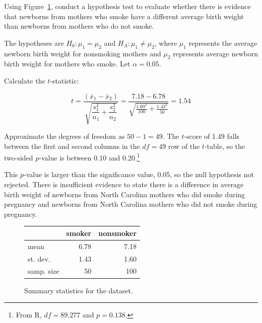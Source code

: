 \begin{examplewrap}
\begin{nexample}{Using Figure~\ref{summaryStatsBabySmoke}, conduct a hypothesis test to evaluate whether there is evidence that newborns from mothers who smoke have a different average birth weight than newborns from mothers who do not smoke.}

The hypotheses are $H_0: \mu_{1} = \mu_{2}$ and $H_A: \mu_{1} \neq \mu_{2}$, where $\mu_{1}$ represents the average newborn birth weight for nonsmoking mothers and $\mu_{2}$ represents average newborn birth weight for mothers who smoke. Let $\alpha = 0.05$. 	

Calculate the $t$-statistic:

\[t = \dfrac{(\overline{x}_1 - \overline{x}_2)}{\sqrt{\dfrac{s_{1}^{2}}{n_1} + \dfrac{s_{2}^{2}}{n_2}}} = \dfrac{7.18 - 6.78}{\sqrt{\frac{1.60^2}{100} + \frac{1.43^2}{50}}} = 1.54\]

Approximate the degrees of freedom as $50 - 1 = 49$. The $t$-score of 1.49 falls between the first and second columns in the $df = 49$ row of the $t$-table, so the two-sided $p$-value is between 0.10 and 0.20.\footnote{From \textsf{R}, $df = 89.277$ and $p = 0.138$.}

This $p$-value is larger than the significance value, 0.05, so the null hypothesis not rejected. There is insufficient evidence to state there is a difference in average birth weight of newborns from North Carolina mothers who did smoke during pregnancy and newborns from North Carolina mothers who did not smoke during pregnancy.
\end{nexample}
\end{examplewrap}

\begin{figure}[hhh]
	\centering
	\begin{tabular}{lrr}
		& smoker & nonsmoker \\
		\hline
		mean & 6.78 & 7.18 \\
		st. dev. & 1.43 & 1.60 \\
		samp. size & 50 & 100 \\
		\hline
	\end{tabular}
	\caption{Summary statistics for the  dataset.}
	\label{summaryStatsBabySmoke}
\end{figure}		




\textD{\newpage}



